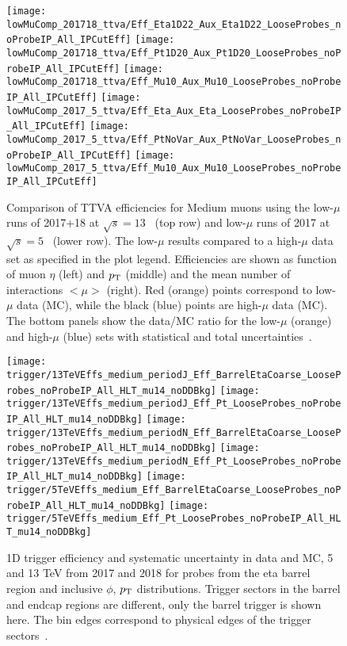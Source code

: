 	\begin{figure}  \centering
		\texttt{[image: lowMuComp\_201718\_ttva/Eff\_Eta1D22\_Aux\_Eta1D22\_LooseProbes\_noProbeIP\_All\_IPCutEff]}%
		\texttt{[image: lowMuComp\_201718\_ttva/Eff\_Pt1D20\_Aux\_Pt1D20\_LooseProbes\_noProbeIP\_All\_IPCutEff]}
		\texttt{[image: lowMuComp\_201718\_ttva/Eff\_Mu10\_Aux\_Mu10\_LooseProbes\_noProbeIP\_All\_IPCutEff]}%
		\texttt{[image: lowMuComp\_2017\_5\_ttva/Eff\_Eta\_Aux\_Eta\_LooseProbes\_noProbeIP\_All\_IPCutEff]}
		\texttt{[image: lowMuComp\_2017\_5\_ttva/Eff\_PtNoVar\_Aux\_PtNoVar\_LooseProbes\_noProbeIP\_All\_IPCutEff]}%
		\texttt{[image: lowMuComp\_2017\_5\_ttva/Eff\_Mu10\_Aux\_Mu10\_LooseProbes\_noProbeIP\_All\_IPCutEff]}
	
		\caption{Comparison of TTVA efficiencies for Medium muons using the
			low-$\mu$ runs of 2017+18 at $\sqrt{s}=13$~\TeV{} (top row) and
			low-$\mu$ runs of 2017 at $\sqrt{s}=5$~\TeV{} (lower row).
			The low-$\mu$ results compared to a high-$\mu$ data set as specified in the plot legend.
			Efficiencies are shown as function of muon $\eta$ (left) and
			$p_{\text{T}}$ (middle) and the mean number of interactions $<\mu>$
			(right). Red (orange) points correspond to low-$\mu$ data (MC),
			while the black (blue) points are high-$\mu$ data (MC). The bottom
			panels show the data/MC ratio for the low-$\mu$ (orange) and
			high-$\mu$ (blue) sets with statistical and total
			uncertainties~\cite{int_note_muons}.}\label{app:fig:ttva-lowMu1}
	\end{figure}
	\begin{figure}
		\centering
		\texttt{[image: trigger/13TeVEffs\_medium\_periodJ\_Eff\_BarrelEtaCoarse\_LooseProbes\_noProbeIP\_All\_HLT\_mu14\_noDDBkg]}
		\texttt{[image: trigger/13TeVEffs\_medium\_periodJ\_Eff\_Pt\_LooseProbes\_noProbeIP\_All\_HLT\_mu14\_noDDBkg]}
		\texttt{[image: trigger/13TeVEffs\_medium\_periodN\_Eff\_BarrelEtaCoarse\_LooseProbes\_noProbeIP\_All\_HLT\_mu14\_noDDBkg]}
		\texttt{[image: trigger/13TeVEffs\_medium\_periodN\_Eff\_Pt\_LooseProbes\_noProbeIP\_All\_HLT\_mu14\_noDDBkg]}
		\texttt{[image: trigger/5TeVEffs\_medium\_Eff\_BarrelEtaCoarse\_LooseProbes\_noProbeIP\_All\_HLT\_mu14\_noDDBkg]}
		\texttt{[image: trigger/5TeVEffs\_medium\_Eff\_Pt\_LooseProbes\_noProbeIP\_All\_HLT\_mu14\_noDDBkg]}
		
		\caption{1D trigger efficiency and systematic uncertainty in data and MC, 5 and 13 TeV from 2017 and 2018 for probes from the eta barrel region and inclusive $\phi$, $p_{\text{T}}$ distributions. Trigger sectors in the barrel and endcap regions are different, only the barrel trigger is shown here. The bin edges correspond to physical edges of the trigger sectors~\cite{int_note_muons}. } \label{trig:1d2018}
	\end{figure}

